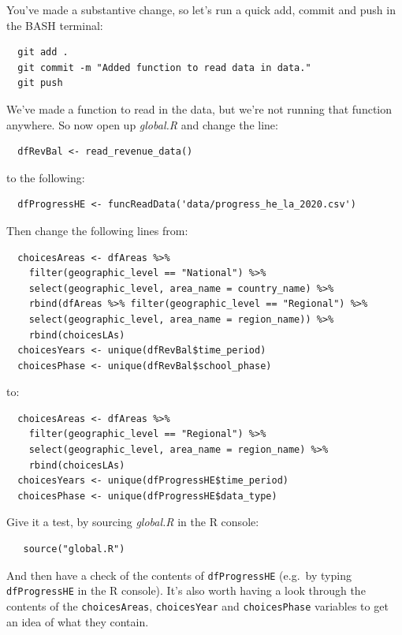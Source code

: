 \documentclass[
  12pt,
]{article}
\begin{document}
You've made a substantive change, so let's run a quick add, commit and
push in the BASH terminal:

\begin{verbatim}
  git add .
  git commit -m "Added function to read data in data."
  git push
\end{verbatim}

We've made a function to read in the data, but we're not running that
function anywhere. So now open up \emph{global.R} and change the line:

\begin{verbatim}
  dfRevBal <- read_revenue_data()
\end{verbatim}

to the following:

\begin{verbatim}
  dfProgressHE <- funcReadData('data/progress_he_la_2020.csv')
\end{verbatim}

Then change the following lines from:

\begin{verbatim}
  choicesAreas <- dfAreas %>%
    filter(geographic_level == "National") %>%
    select(geographic_level, area_name = country_name) %>%
    rbind(dfAreas %>% filter(geographic_level == "Regional") %>% 
    select(geographic_level, area_name = region_name)) %>%
    rbind(choicesLAs)
  choicesYears <- unique(dfRevBal$time_period)
  choicesPhase <- unique(dfRevBal$school_phase)
\end{verbatim}

to:

\begin{verbatim}
  choicesAreas <- dfAreas %>%
    filter(geographic_level == "Regional") %>% 
    select(geographic_level, area_name = region_name) %>%
    rbind(choicesLAs)
  choicesYears <- unique(dfProgressHE$time_period)
  choicesPhase <- unique(dfProgressHE$data_type)
\end{verbatim}

Give it a test, by sourcing \emph{global.R} in the R console:

\begin{verbatim}
   source("global.R")
\end{verbatim}

And then have a check of the contents of \texttt{dfProgressHE} (e.g.~by
typing \texttt{dfProgressHE} in the R console). It's also worth having a
look through the contents of the \texttt{choicesAreas},
\texttt{choicesYear} and \texttt{choicesPhase} variables to get an idea
of what they contain.
\end{document}
